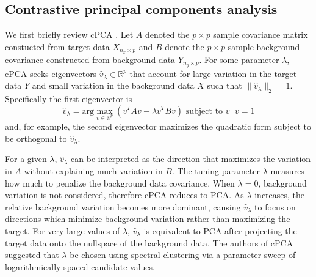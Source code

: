 \documentclass[12pt]{article}
\begin{document}
\subsection{Contrastive principal components analysis}
We first briefly review cPCA \cite{Abid}. Let $A$ denoted the $p\times p$ sample covariance matrix constucted from target data $X_{n_x \times p}$ and $B$ denote the $p\times p$ sample background covariance constructed from background data $Y_{n_y \times p}$. For some parameter $\lambda$, cPCA seeks eigenvectors $\hat{v}_\lambda \in \mathbb{R}^p$ that account for large variation in the target data $Y$ and small variation in the background data $X$ such that $\|\hat{v}_\lambda\|_2 = 1$. Specifically the first eigenvector is
\begin{equation}
  \label{eq:cpca}
  \hat{v}_\lambda = \text{arg}\max_{v \in \mathbb{R}^p}{\left(v^TAv - \lambda v^TBv\right)} \mbox{ subject to } v^\top  v = 1 
\end{equation}
and, for example, the second eigenvector maximizes the quadratic form subject to be orthogonal to $\hat{v}_\lambda$.

For a given $\lambda$, $\hat{v}_\lambda$ can be interpreted as the direction that maximizes the variation in $A$ without explaining much variation in $B$. The tuning parameter $\lambda$ measures how much to penalize the background data covariance. When $\lambda = 0$, background variation is not considered, therefore cPCA reduces to PCA. As $\lambda$ increases, the relative background variation becomes more dominant, causing $\hat{v}_\lambda$ to focus on directions which minimize background variation rather than maximizing the target. For very large values of $\lambda$, $\hat{v}_\lambda$ is equivalent to PCA after projecting the target data onto the nullspace of the background data.  The authors of cPCA suggested that $\lambda$ be chosen using spectral clustering via a parameter sweep of logarithmically spaced candidate values.
\end{document}
